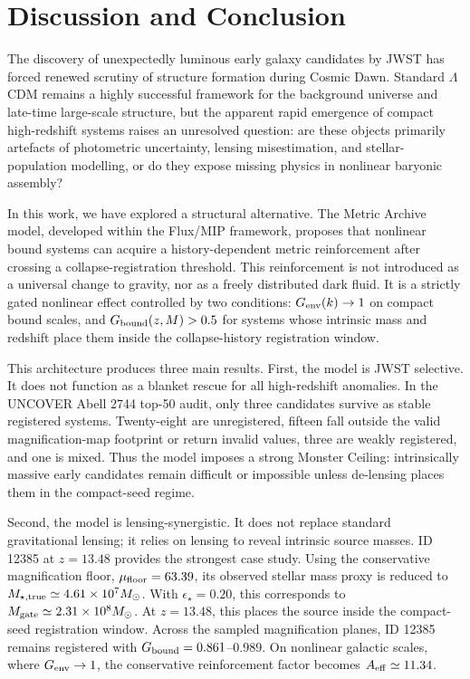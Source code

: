 \documentclass[11pt,a4paper]{article}
\newcommand{\LCDM}{$\Lambda$CDM}
\newcommand{\Msun}{M_\odot}
\begin{document}
\section{Discussion and Conclusion}

The discovery of unexpectedly luminous early galaxy candidates by JWST has forced renewed scrutiny of structure formation during Cosmic Dawn. Standard \LCDM{} remains a highly successful framework for the background universe and late-time large-scale structure, but the apparent rapid emergence of compact high-redshift systems raises an unresolved question: are these objects primarily artefacts of photometric uncertainty, lensing misestimation, and stellar-population modelling, or do they expose missing physics in nonlinear baryonic assembly?

In this work, we have explored a structural alternative. The Metric Archive model, developed within the Flux/MIP framework, proposes that nonlinear bound systems can acquire a history-dependent metric reinforcement after crossing a collapse-registration threshold. This reinforcement is not introduced as a universal change to gravity, nor as a freely distributed dark fluid. It is a strictly gated nonlinear effect controlled by two conditions: $G_{\rm env}(k)\rightarrow1$ on compact bound scales, and $G_{\rm bound}(z,M)>0.5$ for systems whose intrinsic mass and redshift place them inside the collapse-history registration window.

This architecture produces three main results. First, the model is JWST selective. It does not function as a blanket rescue for all high-redshift anomalies. In the UNCOVER Abell 2744 top-50 audit, only three candidates survive as stable registered systems. Twenty-eight are unregistered, fifteen fall outside the valid magnification-map footprint or return invalid values, three are weakly registered, and one is mixed. Thus the model imposes a strong Monster Ceiling: intrinsically massive early candidates remain difficult or impossible unless de-lensing places them in the compact-seed regime.

Second, the model is lensing-synergistic. It does not replace standard gravitational lensing; it relies on lensing to reveal intrinsic source masses. ID 12385 at $z=13.48$ provides the strongest case study. Using the conservative magnification floor, $\mu_{\rm floor}=63.39$, its observed stellar mass proxy is reduced to $M_{\star,\rm true}\simeq4.61\times10^7\Msun$. With $\epsilon_\star=0.20$, this corresponds to $M_{\rm gate}\simeq2.31\times10^8\Msun$. At $z=13.48$, this places the source inside the compact-seed registration window. Across the sampled magnification planes, ID 12385 remains registered with $G_{\rm bound}=0.861$--$0.989$. On nonlinear galactic scales, where $G_{\rm env}\rightarrow1$, the conservative reinforcement factor becomes $A_{\rm eff}\simeq11.34$.
\end{document}
